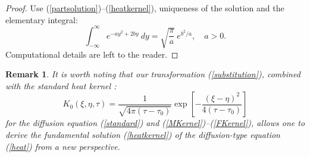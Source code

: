\documentclass[12pt,reqno]{amsart}
\theoremstyle{plain}
\newtheorem{remark}{Remark}
\numberwithin{equation}{section}
\begin{document}
\begin{proof}
Use (\ref{partsolution})--(\ref{heatkernel}), uniqueness of the solution and
the elementary integral:\begin{equation}
\int_{-\infty }^{\infty }e^{-ay^{2}+2by}\ dy=\sqrt{\frac{\pi }{a}}\
e^{b^{2}/a},\quad a>0.  \label{Gauss}
\end{equation}Computational details are left to the reader.
\end{proof}

\begin{remark}
It is worth noting that our transformation (\ref{substitution}), combined
with the standard heat kernel \cite{NiPDE}:\begin{equation}
K_{0}\left( \xi ,\eta ,\tau \right) =\frac{1}{\sqrt{4\pi \left( \tau -\tau
_{0}\right) }}\exp \left[ -\frac{\left( \xi -\eta \right) ^{2}}{4\left( \tau
-\tau _{0}\right) }\right]  \label{heatstandard}
\end{equation}for the diffusion equation (\ref{standard}) and (\ref{MKernel})--(\ref{FKernel}), allows one to derive the fundamental solution (\ref{heatkernel})
of the diffusion-type equation (\ref{heat}) from a new perspective.
\end{remark}
\end{document}
